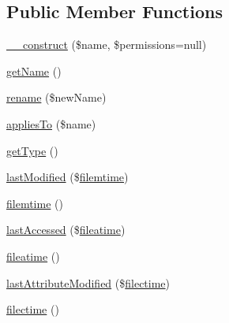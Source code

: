 \subsection*{Public Member Functions}
\begin{DoxyCompactItemize}
\item 
\mbox{\hyperlink{classorg_1_1bovigo_1_1vfs_1_1vfs_stream_abstract_content_acb8ea4ab5eedb93ea03a6628f5915f04}{\+\_\+\+\_\+construct}} (\$name, \$permissions=null)
\item 
\mbox{\hyperlink{classorg_1_1bovigo_1_1vfs_1_1vfs_stream_abstract_content_a3d0963e68bb313b163a73f2803c64600}{get\+Name}} ()
\item 
\mbox{\hyperlink{classorg_1_1bovigo_1_1vfs_1_1vfs_stream_abstract_content_ab40397a8b5cf98ff82734ce7b1276363}{rename}} (\$new\+Name)
\item 
\mbox{\hyperlink{classorg_1_1bovigo_1_1vfs_1_1vfs_stream_abstract_content_a1769b12aee6e9730bcf9b56703eb6a03}{applies\+To}} (\$name)
\item 
\mbox{\hyperlink{classorg_1_1bovigo_1_1vfs_1_1vfs_stream_abstract_content_a830b5c75df72b32396701bc563fbe3c7}{get\+Type}} ()
\item 
\mbox{\hyperlink{classorg_1_1bovigo_1_1vfs_1_1vfs_stream_abstract_content_ae862e04a845949a0d2bf4cada6a06ac4}{last\+Modified}} (\$\mbox{\hyperlink{classorg_1_1bovigo_1_1vfs_1_1vfs_stream_abstract_content_ad730553073cd7d21080fe7c2770ef457}{filemtime}})
\item 
\mbox{\hyperlink{classorg_1_1bovigo_1_1vfs_1_1vfs_stream_abstract_content_ad730553073cd7d21080fe7c2770ef457}{filemtime}} ()
\item 
\mbox{\hyperlink{classorg_1_1bovigo_1_1vfs_1_1vfs_stream_abstract_content_aa826d5372120353c28fa1cd4ec4bf59b}{last\+Accessed}} (\$\mbox{\hyperlink{classorg_1_1bovigo_1_1vfs_1_1vfs_stream_abstract_content_a759a9858b5dea80fa68db2668df45ca0}{fileatime}})
\item 
\mbox{\hyperlink{classorg_1_1bovigo_1_1vfs_1_1vfs_stream_abstract_content_a759a9858b5dea80fa68db2668df45ca0}{fileatime}} ()
\item 
\mbox{\hyperlink{classorg_1_1bovigo_1_1vfs_1_1vfs_stream_abstract_content_af92f0658173972169c5900a0c0adc224}{last\+Attribute\+Modified}} (\$\mbox{\hyperlink{classorg_1_1bovigo_1_1vfs_1_1vfs_stream_abstract_content_a2c61fdbe7cabe3e7ec79881084be2ba5}{filectime}})
\item 
\mbox{\hyperlink{classorg_1_1bovigo_1_1vfs_1_1vfs_stream_abstract_content_a2c61fdbe7cabe3e7ec79881084be2ba5}{filectime}} ()
\item 

\end{DoxyCompactItemize}
